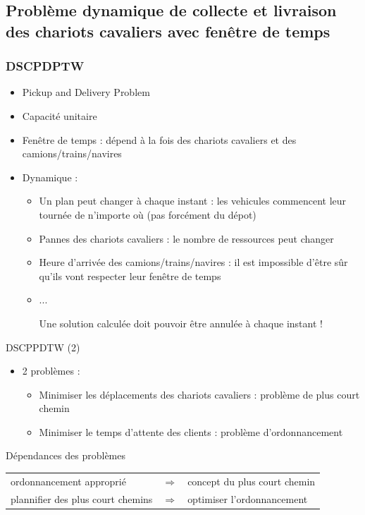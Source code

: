 \documentclass{beamer}
\begin{document}
\subsection*{Problème dynamique de collecte et livraison des chariots cavaliers avec fenêtre de temps}
\begin{frame}
\frametitle{DSCPDPTW}
	\begin{itemize}
 		\item Pickup and Delivery Problem
		\item Capacité unitaire
		\item Fenêtre de temps : \small dépend à la fois des chariots cavaliers et des camions/trains/navires\normalsize
		\item Dynamique : 
			   \begin{itemize}
			    \item Un plan peut changer à chaque instant : \small les vehicules commencent leur tournée de n'importe où (pas forcément du dépot)\normalsize
			    \item Pannes des chariots cavaliers : \small le nombre de ressources peut changer\normalsize
			    \item Heure d'arrivée des camions/trains/navires : \small il est impossible d'être sûr qu'ils vont respecter leur fenêtre de temps\normalsize
			    \item ...
			    \begin{center}  Une solution calculée doit pouvoir être annulée à chaque instant ! \end{center}
			    \end{itemize}
	\end{itemize}
\end{frame}
\begin{frame}{DSCPPDTW (2)}
	\begin{itemize}
	 \item 2 problèmes : 
		\begin{itemize}
 			\item Minimiser les déplacements des chariots cavaliers : problème de plus court chemin
			\item Minimiser le temps d'attente des clients : problème d'ordonnancement
		\end{itemize}
	\end{itemize}
	
	
	\begin{alertblock}{Dépendances des problèmes}
		\begin{tabular}{*{3}{l}}
			ordonnancement approprié & $\Rightarrow$ & concept du plus court chemin\\
			plannifier des plus court chemins & $\Rightarrow$ & optimiser l'ordonnancement
		\end{tabular}
	\end{alertblock}	
\end{frame}
\end{document}
